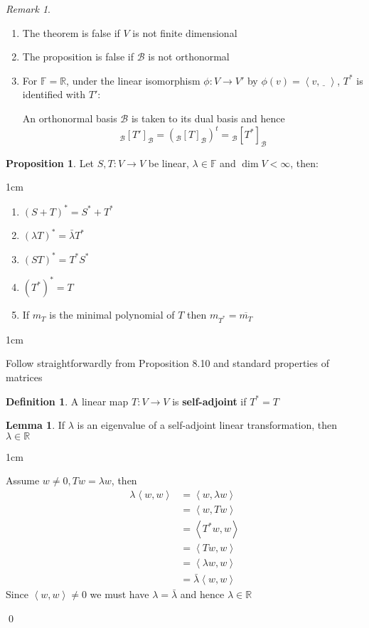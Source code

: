 \documentclass[11pt, a4paper]{report}
\makeatletter
\numberwithin{equation}{section}
\newcommand{\R}{\mathbb{R}}
\newcommand{\B}{\mathcal{B}}
\newcommand{\F}{\mathbb{F}}
\newcommand{\blnk}{\underline{\;\;}\,}
\newcommand{\spn}[1]{\left\langle #1 \right\rangle}
\numberwithin{equation}{subsection}
\theoremstyle{plain}
\theoremstyle{definition}
\newtheorem{defn}{Definition}[chapter]
\newtheorem{lem}[thm]{Lemma}
\newtheorem{prop}[thm]{Proposition}
\theoremstyle{remark}
\newtheorem*{rem}{Remark}
\newtheorem*{prf}{Proof}
\renewenvironment{prf}[1][\proofname]{\par
  \vspace{-\topsep}%
  \normalfont
  \topsep0pt \partopsep0pt %
  \trivlist
  \item[\hskip\labelsep
        \itshape
    #1\@addpunct{.}]\ignorespaces
}{%
  \popQED\endtrivlist\@endpefalse
  \addvspace{6pt plus 6pt} %
}
\newcommand{\pr}[1]{\begin{adjustwidth}{1cm}{} \begin{prf} #1 \end{prf} \end{adjustwidth}}
\makeatother
\begin{document}
\begin{rem}${}$
\begin{enumerate}[(1) ]
\item The theorem is false if $V$ is not finite dimensional
\item The proposition is false if $\B$ is not orthonormal
\item For $\F = \R$, under the linear isomorphism $\phi: V \to V'$ by $\phi(v) = \spn{v, \blnk}$, $T^*$ is identified with $T'$:

An orthonormal basis $\B$ is taken to its dual basis and hence
$${_\B[T']_\B} = \left( {_\B[T]_\B} \right)^t = {_\B[T^*]_\B}$$
\end{enumerate}
\end{rem}

\newpage

\begin{prop}
Let $S,T : V \to V$ be linear, $\lambda \in \F$ and $\dim V < \infty$, then:
\begin{adjustwidth}{1cm}{}
\begin{enumerate}[(1) ]
\item $(S + T)^* = S^* + T^*$
\item $(\lambda T)^* = \bar{\lambda}T^*$
\item $(ST)^* = T^*S^*$
\item $(T^*)^* = T$
\item If $m_T$ is the minimal polynomial of $T$ then $m_{T^*} = \overline{m_T}$
\end{enumerate}
\end{adjustwidth}
\pr{Follow straightforwardly from Proposition 8.10 and standard properties of matrices
}
\end{prop}

\begin{defn} 
A linear map $T: V \to V$ is \textbf{self-adjoint} if $T^* = T$
\end{defn}

\begin{lem}
If $\lambda$ is an eigenvalue of a self-adjoint linear transformation, then $\lambda \in \R$

\pr{
Assume $w \neq 0, Tw = \lambda w$, then
\begin{align*}
\lambda \spn{w,w}	&= \spn{w, \lambda w} \tag{linearity in second coordinate}\\
					&= \spn{w, Tw} \tag{$Tw = \lambda w$}\\
					&= \spn{T^*w, w} \tag{definition of adjoint}\\
					&= \spn{Tw, w} \tag{$T$ self-adjoint}\\
					&= \spn{\lambda w, w} \tag{$Tw = \lambda w$}\\
					&= \bar{\lambda} \spn{w,w} \tag{conjugate linearity in first coordinate}
\end{align*}
Since $\spn{w,w} \neq 0$ we must have $\lambda = \bar{\lambda}$ and hence $\lambda \in \R$
}\qed
\end{lem}
\end{document}
